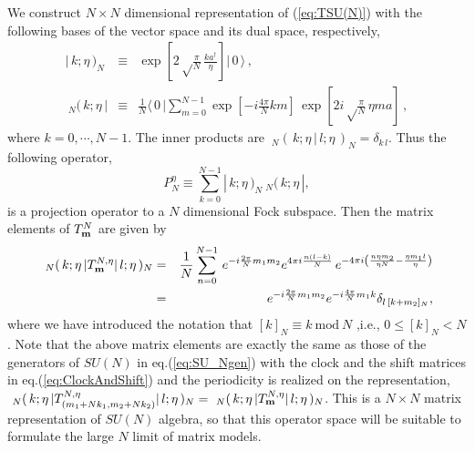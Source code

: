 \documentclass[a4paper,12pt]{article}
\newcommand{\bra}[1]{\langle\,#1\,|}
\newcommand{\ket}[1]{|\,#1\,\rangle}
\newcommand{\Nbra}[1]{~_N(\,#1\,|}
\newcommand{\Nket}[1]{|\,#1\,)_N}
\newcommand{\Nbracket}[2]{~_N(\,#1\,|\,#2\,)_N}
\newcommand{\nn}{\nonumber\\}
\begin{document}
We construct $N\times N$ dimensional representation of
(\ref{eq:TSU(N)}) with the following bases of the vector space
and its dual space, respectively,
\begin{eqnarray}
 \Nket{k;\eta}&\equiv&
  \exp\left[2\sqrt\frac{\pi}{N}\,
  \frac{k a^\dagger}{\eta}\right]\ket{0}\,,\label{eq:ND-Ket}\\
 \Nbra{k;\eta}&\equiv&
  \frac{1}{N}\bra{0}\sum_{m=0}^{N-1}
  \exp\left[-i\frac{4\pi}{N}km\right]\,
  \exp\left[2i\sqrt\frac{\pi}{N}\,\eta ma\right]\,,
  \label{eq:ND-Bra}
\end{eqnarray}
where $k=0,\cdots,N-1$. The inner products are
$\Nbracket{k;\eta}{l;\eta}=\delta_{k\,l}$.
Thus the following operator,
\begin{equation}
 P^{\eta}_{N}\equiv\sum_{k=0}^{N-1} \Nket{k;\eta}\Nbra{k;\eta},
  \label{eq:projection}
\end{equation}
is a projection operator to a $N$ dimensional Fock subspace.
Then the matrix elements of $T^N_{\bf m}$ are given by
\begin{eqnarray}
 \Nbra{k;\eta} T^{N,\eta}_{\bf m}\Nket{l;\eta}&=&
  \frac{1}{N}\sum_{n=0}^{N-1}\,e^{-i\frac{2\pi}{N}m_1m_2}
	 e^{4\pi i\frac{n(l-k)}{N}}\,e^{-4\pi i\left(\frac{n\eta
  m_2}{\eta N} - \frac{\eta m_1 l}{\eta}\right)}\nn
  &=&e^{-i\frac{2\pi}{N}m_1m_2}
  e^{-i\frac{4\pi}{N}m_1k}\delta_{l\,[k+m_2]_N},
  \label{eq:SU(N)Mx-ele}
\end{eqnarray}
where we have introduced the notation that $[k]_{N} \equiv
k~\mbox{mod}~N$ ,i.e., $0\leq [k]_N< N$.
Note that the above matrix elements are exactly the same as those of
the generators of $SU(N)$ in eq.(\ref{eq:SU_Ngen}) with the clock and
the shift matrices in eq.(\ref{eq:ClockAndShift}) and the periodicity
is realized on the representation,  $\Nbra{k;\eta}
T^{N,\eta}_{(m_1+Nk_1,m_2+Nk_2)}\Nket{l;\eta} = \Nbra{k;\eta}
T^{N,\eta}_{\bf m}\Nket{l;\eta}$.
This is a $N\times N$ matrix representation of $SU(N)$ algebra, so
that this operator space will be suitable to formulate the large $N$
limit of matrix models.
\end{document}

